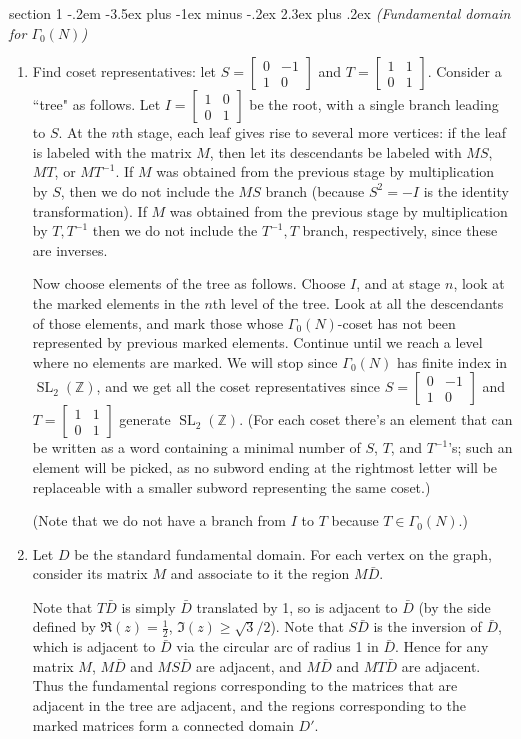 \documentclass[12pt]{article}
\makeatletter
\theoremstyle{norm}
\newcommand{\Z}[0]{\mathbb{Z}}
\newcommand{\rc}[1]{\frac{1}{#1}}
\newcommand{\Ga}[0]{\Gamma}
\newcommand{\SL}{\operatorname{SL}}
\newcommand{\smatt}[4]{
\left[
\begin{smallmatrix}
{#1}&{#2}\\
{#3}&{#4}
\end{smallmatrix}
\right]}
\newenvironment{problem}{\@startsection
       {section}
       {1}
       {-.2em}
       {-3.5ex plus -1ex minus -.2ex}
       {2.3ex plus .2ex}
       {\pagebreak[3]%
       \large\bf\noindent{Problem }
       }
       }
       {%
       }
\makeatother
\begin{document}
\begin{problem} {\it(Fundamental domain for $\Ga_0(N)$)}
\begin{enumerate}
\item Find coset representatives: let $S=\smatt 0{-1}{1}0$ and $T=\smatt1101$. %
Consider a ``tree" as follows. Let $I=\smatt 1001$ be the root, with a single branch leading to $S$. At the $n$th stage, each leaf gives rise to several more vertices: if the leaf is labeled with the matrix $M$, then let its descendants be labeled with $MS$, $MT$, or $MT^{-1}$. If $M$ was obtained from the previous stage by multiplication by $S$, then we do not include the $MS$ branch (because $S^2=-I$ is the identity transformation). If $M$ was obtained from the previous stage by multiplication by $T, T^{-1}$ then we do not include the $T^{-1},T$ branch, respectively, since these are inverses.

Now choose elements of the tree as follows. Choose $I$, and at stage $n$, look at the marked elements in the $n$th level of the tree. Look at all the descendants of those elements, and mark those whose $\Ga_0(N)$-coset has not been represented by previous marked elements. Continue until we reach a level where no elements are marked. We will stop since $\Ga_0(N)$ has finite index in $\SL_2(\Z)$, and we get all the coset representatives since $S=\smatt 0{-1}{1}0$ and $T=\smatt1101$ generate $\SL_2(\Z)$. (For each coset there's an element that can be written as a word containing a minimal number of $S$, $T$, and $T^{-1}$'s; such an element will be picked, as no subword ending at the rightmost letter will be replaceable with a smaller subword representing the same coset.)

(Note that we do not have a branch from $I$ to $T$ because $T\in \Ga_0(N)$.)

\item Let $D$ be the standard fundamental domain. For each vertex on the graph, consider its matrix $M$ and associate to it the region $M\bar D$.

Note that $T\bar D$ is simply $\bar D$ translated by 1, so is adjacent to $\bar D$ (by the side defined by $\Re(z)=\rc{2}$, $\Im(z)\geq \sqrt 3/2$). Note that $S\bar D$ is the inversion of $\bar D$, which is adjacent to $\bar D$ via the circular arc of radius 1 in $\bar D$. Hence for any matrix $M$, $M\bar D$ and $MS\bar D$ are adjacent, and $M\bar D$ and $MT\bar D$ are adjacent. Thus the fundamental regions corresponding to the matrices that are adjacent in the tree are adjacent, and the regions corresponding to the marked matrices form a connected domain $D'$.


\end{enumerate}
\end{problem}
\end{document}
